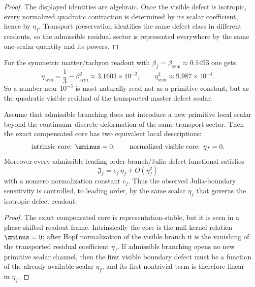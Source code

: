 \begin{proof}
The displayed identities are algebraic. Once the visible defect is isotropic, every normalized quadratic contraction is determined by its scalar coefficient, hence by $\eta_f$. Transport preservation identifies the same defect class in different readouts, so the admissible residual sector is represented everywhere by the same one-scalar quantity and its powers.
\end{proof}

\begin{remark}
For the symmetric matter/tachyon readout with $\beta_f=\beta_{\mathrm{sym}}\approx0.5493$ one gets
\[
  \eta_{\mathrm{sym}}=\frac13-\beta_{\mathrm{sym}}^2\approx 3.1603\times10^{-2},
  \qquad
  \eta_{\mathrm{sym}}^2\approx 9.987\times10^{-4}.
\]
So a number near $10^{-3}$ is most naturally read not as a primitive constant, but as the quadratic visible residual of the transported master defect scalar.
\end{remark}

\begin{proposition}
\label{prop:julia-master-residual}
Assume that admissible branching does not introduce a new primitive local scalar beyond the continuum--discrete deformation of the same transport sector. Then the exact compensated core has two equivalent local descriptions:
\[
  \text{intrinsic core: }\zminus=0,
  \qquad
  \text{normalized visible core: }\eta_f=0.
\]
Moreover every admissible leading-order branch/Julia defect functional satisfies
\[
  \mathfrak J_f=c_f\,\eta_f+O(\eta_f^2)
\]
with a nonzero normalization constant $c_f$. Thus the observed Julia-boundary sensitivity is controlled, to leading order, by the same scalar $\eta_f$ that governs the isotropic defect readout.
\end{proposition}

\begin{proof}
The exact compensated core is representation-stable, but it is seen in a phase-shifted readout frame. Intrinsically the core is the null-kernel relation $\zminus=0$; after Hopf normalization of the visible branch it is the vanishing of the transported residual coefficient $\eta_f$. If admissible branching opens no new primitive scalar channel, then the first visible boundary defect must be a function of the already available scalar $\eta_f$, and its first nontrivial term is therefore linear in $\eta_f$.
\end{proof}

